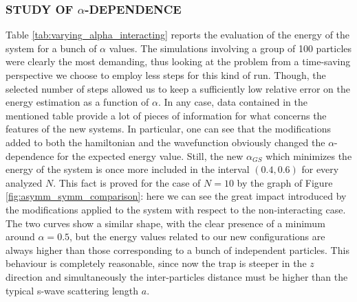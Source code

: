 \subsubsection*{STUDY OF $\alpha$-DEPENDENCE }
Table \ref{tab:varying_alpha_interacting} reports the evaluation of the energy of the system for a bunch of $\alpha$ values. The simulations involving a group of 100 particles were clearly the most demanding, thus looking at the problem from a time-saving perspective we choose to employ less steps for this kind of run. Though, the selected number of steps allowed us to keep a sufficiently low relative error on the energy estimation as a function of $\alpha$. In any case, data contained in the mentioned table provide a lot of pieces of information for what concerns the features of the new systems. In particular, one can see that the modifications added to both the hamiltonian and the wavefunction obviously changed the $\alpha$-dependence for the expected energy value. Still, the new $\alpha_{GS}$ which minimizes the energy of the system is once more included in the interval $(0.4, 0.6)$ for every analyzed $N$. This fact is proved for the case of $N=10$ by the graph of Figure \ref{fig:asymm_symm_comparison}: here we can see the great impact introduced by the modifications applied to the system with respect to the non-interacting case. The two curves show a similar shape, with the clear presence of a minimum around $\alpha=0.5$, but the energy values related to our new configurations are always higher than those corresponding to a bunch of independent particles. This behaviour is completely reasonable, since now the trap is steeper in the $z$ direction and simultaneously the inter-particles distance must be higher than the typical s-wave scattering length $a$. 

